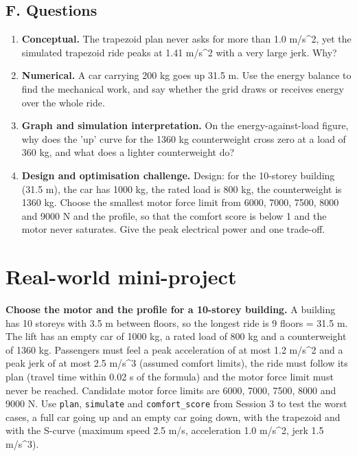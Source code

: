 \documentclass[11pt,a4paper]{article}
\begin{document}
\subsection*{F. Questions}
\begin{enumerate}[nosep]
\item \textbf{Conceptual.} The trapezoid plan never asks for more than 1.0 m/s\textasciicircum{}2, yet the simulated trapezoid ride peaks at 1.41 m/s\textasciicircum{}2 with a very large jerk. Why?
\item \textbf{Numerical.} A car carrying 200 kg goes up 31.5 m. Use the energy balance to find the mechanical work, and say whether the grid draws or receives energy over the whole ride.
\item \textbf{Graph and simulation interpretation.} On the energy-against-load figure, why does the 'up' curve for the 1360 kg counterweight cross zero at a load of 360 kg, and what does a lighter counterweight do?
\item \textbf{Design and optimisation challenge.} Design: for the 10-storey building (31.5 m), the car has 1000 kg, the rated load is 800 kg, the counterweight is 1360 kg. Choose the smallest motor force limit from 6000, 7000, 7500, 8000 and 9000 N and the profile, so that the comfort score is below 1 and the motor never saturates. Give the peak electrical power and one trade-off.
\end{enumerate}

\section{Real-world mini-project}
\textbf{Choose the motor and the profile for a 10-storey building.} A building has 10 storeys with 3.5 m between floors, so the longest ride is 9 floors = 31.5 m. The lift has an empty car of 1000 kg, a rated load of 800 kg and a counterweight of 1360 kg. Passengers must feel a peak acceleration of at most 1.2 m/s\textasciicircum{}2 and a peak jerk of at most 2.5 m/s\textasciicircum{}3 (assumed comfort limits), the ride must follow its plan (travel time within 0.02 s of the formula) and the motor force limit must never be reached. Candidate motor force limits are 6000, 7000, 7500, 8000 and 9000 N. Use \texttt{plan}, \texttt{simulate} and \texttt{comfort\_score} from Session 3 to test the worst cases, a full car going up and an empty car going down, with the trapezoid and with the S-curve (maximum speed 2.5 m/s, acceleration 1.0 m/s\textasciicircum{}2, jerk 1.5 m/s\textasciicircum{}3).
\end{document}
